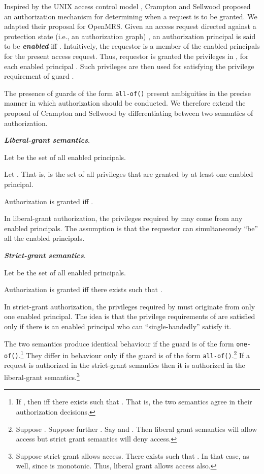 \documentclass{acm_proc_article-sp}
\newcommand{\Dfn}[1]{\textbf{\emph{#1}}}
\newcommand{\textcode}[1]{\texttt{#1}}
\begin{document}
Inspired by the UNIX access control model \cite{Crampton:2008},
Crampton and Sellwood proposed an authorization mechanism for
determining when a request is to be granted. We adapted their proposal
for OpenMRS.  Given an access request  directed against a
protection state (i.e., an authorization graph) , an authorization
principal  is said to be \Dfn{enabled} iff
.  Intuitively, the requestor
 is a member of the enabled principals for the present access
request.  Thus, requestor  is granted the privileges in
, for each enabled principal .
Such privileges are then used for satisfying the privilege requirement
of guard .

The presence of guards of the form \textcode{all-of()} present
ambiguities in the precise manner in which authorization should be
conducted.  We therefore extend the proposal of Crampton and Sellwood
by differentiating between two semantics of authorization.
\begin{compactenum}
\item \Dfn{Liberal-grant semantics}.  
\begin{compactitem}
\item Let  be the set of all enabled principals.
\item Let .
  That is,  is the set of all privileges that are granted by at
  least one enabled principal.
\item Authorization is granted iff .
\end{compactitem}
In liberal-grant authorization, the privileges required by 
may come from any enabled principals.  The assumption is that
the requestor  can simultaneously ``be'' all the enabled
principals.
\item \Dfn{Strict-grant semantics}.
\begin{compactitem}
\item Let  be the set of all enabled principals.
\item Authorization is granted iff there exists  such that .
\end{compactitem}
In strict-grant authorization, the privileges required by  must
originate from only one enabled principal.  The idea is that the
privilege requirements of  are satisfied only if there is an
enabled principal who can ``single-handedly'' satisfy it.
\end{compactenum}
The two semantics produce identical behaviour if the guard  is of
the form \textcode{one-of()}.\footnote{If , then  iff there exists
   such that .  That is, the two semantics agree in their authorization
  decisions.} They differ in behaviour only if the guard is of the
form \textcode{all-of()}.\footnote{ Suppose .  Suppose further
  .  Say
   and . Then liberal grant semantics will allow access but strict grant
  semantics will deny access.  }  If a request is authorized in the
strict-grant semantics then it is authorized in the liberal-grant
semantics.\footnote{ Suppose strict-grant allows access. There exists
   such that .
  In that case,  as well, since  is monotonic.  Thus, liberal
  grant allows access also.}
\end{document}
